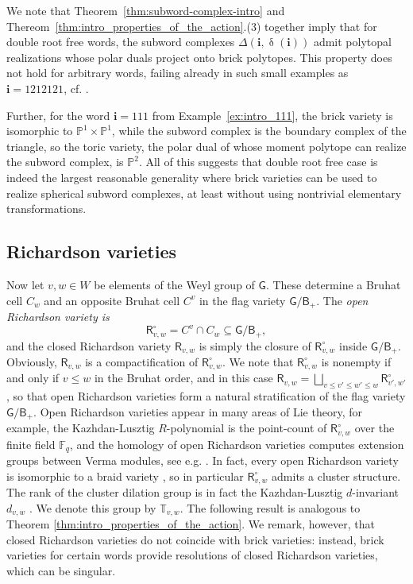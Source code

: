 \documentclass[a4paper, 11pt]{amsart}
\newcommand{\borel}{\mathsf{B}}
\newcommand{\orich}[1]{\mathsf{R}^{\circ}_{#1}}
\newcommand{\rich}[1]{\mathsf{R}_{#1}}
\newcommand{\word}[1]{\mathbf{#1}}
\DeclareMathOperator{\dem}{\delta}
\newcommand{\group}{\mathsf{G}}
\newcommand{\dil}[1]{\mathbb{T}_{#1}}
\theoremstyle{definition}
\begin{document}
We note that Theorem~\ref{thm:subword-complex-intro} and Thereom~\ref{thm:intro_properties_of_the_action}.(3) together imply that for double root free words, the subword complexes $\Delta(\word{i}, \dem(\word{i}))$ admit polytopal realizations whose polar duals project onto brick polytopes. This property does not hold for arbitrary words, failing already in such small examples as $\word{i} = 1212121$, cf. \cite[Proposition 5.9]{pilaud_santos_12}. 

Further, for the word $\word{i} = 111$ from Example~\ref{ex:intro_111}, the brick variety is isomorphic to $\mathbb{P}^1 \times \mathbb{P}^1$, while the subword complex is the boundary complex of the triangle, so the toric variety, the polar dual of whose moment polytope can realize the subword complex, is $\mathbb{P}^2$. All of this suggests that double root free case is indeed the largest reasonable generality where brick varieties can be used to realize spherical subword complexes, at least without using nontrivial elementary transformations.

\subsection{Richardson varieties} Now let $v, w \in W$ be elements of the Weyl group of $\group$. These determine a Bruhat cell $C_w$ and an opposite Bruhat cell $C^v$ in the flag variety $\group/\borel_{+}$. The \emph{open Richardson variety is}
\[
\orich{v,w} = C^v \cap C_w \subseteq \group/\borel_{+},
\]
and the closed Richardson variety $\rich{v,w}$ is simply the closure of $\orich{v,w}$ inside $\group/\borel_{+}$. Obviously, $\rich{v,w}$ is a compactification of $\orich{v,w}$. We note that $\orich{v,w}$ is nonempty if and only if $v \leq w$ in the Bruhat order, and in this case $\rich{v,w} = \bigsqcup_{v \leq v' \leq w' \leq w} \orich{v',w'}$, so that open Richardson varieties form a natural stratification of the flag variety $\group/\borel_{+}$. Open Richardson varieties appear in many areas of Lie theory, for example, the Kazhdan-Lusztig $R$-polynomial \cite{KazhdanLusztig} is the point-count of $\orich{v,w}$ over the finite field $\mathbb{F}_q$, and the homology of open Richardson varieties computes extension groups between Verma modules, see e.g. \cite{GalashinLam-qt}. In fact, every open Richardson variety is isomorphic to a braid variety \cite[Theorem 3.14]{CGGLSS}, so in particular $\orich{v,w}$ admits a cluster structure. The rank of the cluster dilation group is in fact the Kazhdan-Lusztig $d$-invariant $d_{v,w}$ \cite{BarkleyGaetzLam, patimo}. We denote this group by $\dil{v,w}$. The following result is analogous to Theorem \ref{thm:intro_properties_of_the_action}. We remark, however, that closed Richardson varieties do not coincide with brick varieties: instead, brick varieties for certain words provide resolutions of closed Richardson varieties, which can be singular.
\end{document}
